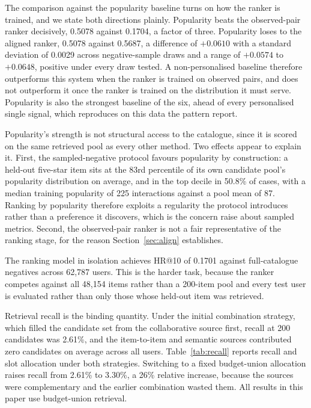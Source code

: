 \documentclass[10pt,twocolumn]{article}
\begin{document}
The comparison against the popularity baseline turns on how the ranker is
trained, and we state both directions plainly. Popularity beats the
observed-pair ranker decisively, 0.5078 against 0.1704, a factor of three.
Popularity loses to the aligned ranker, 0.5078 against 0.5687, a difference of
$+0.0610$ with a standard deviation of 0.0029 across negative-sample draws and
a range of $+0.0574$ to $+0.0648$, positive under every draw tested. A
non-personalised baseline therefore outperforms this system when the ranker is
trained on observed pairs, and does not outperform it once the ranker is
trained on the distribution it must serve. Popularity is also the strongest
baseline of the six, ahead of every personalised single signal, which
reproduces on this data the pattern \citet{dacrema2019really} report.

Popularity's strength is not structural access to the catalogue, since it is
scored on the same retrieved pool as every other method. Two effects appear to
explain it. First, the sampled-negative protocol favours popularity by
construction: a held-out five-star item sits at the 83rd percentile of its own
candidate pool's popularity distribution on average, and in the top decile in
50.8\% of cases, with a median training popularity of 225 interactions against
a pool mean of 87. Ranking by popularity therefore exploits a regularity the
protocol introduces rather than a preference it discovers, which is the
concern \citet{krichene2020sampled} raise about sampled metrics. Second, the
observed-pair ranker is not a fair representative of the ranking stage, for
the reason Section~\ref{sec:align} establishes.

The ranking model in isolation achieves HR@10 of 0.1701 against full-catalogue
negatives across 62{,}787 users. This is the harder task, because the ranker
competes against all 48{,}154 items rather than a 200-item pool and every test
user is evaluated rather than only those whose held-out item was retrieved.

Retrieval recall is the binding quantity. Under the initial combination
strategy, which filled the candidate set from the collaborative source first,
recall at 200 candidates was 2.61\%, and the item-to-item and semantic sources
contributed zero candidates on average across all users.
Table~\ref{tab:recall} reports recall and slot allocation under both
strategies. Switching to a fixed budget-union allocation raises recall from
2.61\% to 3.30\%, a 26\% relative increase, because the sources were
complementary and the earlier combination wasted them. All results in this
paper use budget-union retrieval.
\end{document}
